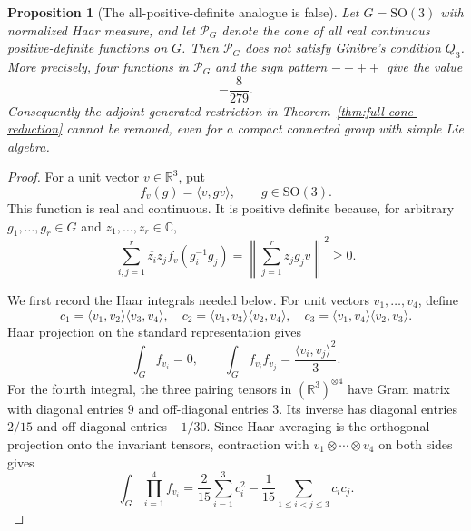 \documentclass[11pt,reqno]{amsart}
\theoremstyle{plain}
\newtheorem{proposition}[theorem]{Proposition}
\theoremstyle{definition}
\begin{document}
\begin{proposition}[The all-positive-definite analogue is false]
\label{prop:all-pd-counterexample}
Let $G=\mathrm{SO}(3)$ with normalized Haar measure, and let
$\mathcal P_G$ denote the cone of all real continuous positive-definite
functions on $G$.  Then $\mathcal P_G$ does not satisfy Ginibre's
condition $Q_3$.  More precisely, four functions in $\mathcal P_G$ and the
sign pattern $--++$ give the value
\[
 -\frac8{279}.
\]
Consequently the adjoint-generated restriction in
Theorem~\ref{thm:full-cone-reduction} cannot be removed, even for a compact
connected group with simple Lie algebra.
\end{proposition}

\begin{proof}
For a unit vector $v\in\mathbb R^3$, put
\[
 f_v(g)=\langle v,gv\rangle ,\qquad g\in\mathrm{SO}(3).
\]
This function is real and continuous.  It is positive definite because,
for arbitrary $g_1,\ldots,g_r\in G$ and $z_1,\ldots,z_r\in\mathbb C$,
\[
 \sum_{i,j=1}^r\overline{z_i}z_j f_v(g_i^{-1}g_j)
 =\left\lVert\sum_{j=1}^r z_jg_jv\right\rVert^2\geq0.
\]

We first record the Haar integrals needed below.  For unit vectors
$v_1,\ldots,v_4$, define
\[
 c_1=\langle v_1,v_2\rangle\langle v_3,v_4\rangle,
 \quad
 c_2=\langle v_1,v_3\rangle\langle v_2,v_4\rangle,
 \quad
 c_3=\langle v_1,v_4\rangle\langle v_2,v_3\rangle.
\]
Haar projection on the standard representation gives
\[
 \int_G f_{v_i}=0,
 \qquad
 \int_G f_{v_i}f_{v_j}
 =\frac{\langle v_i,v_j\rangle^2}{3}.
\]
For the fourth integral, the three pairing tensors in
$(\mathbb R^3)^{\otimes4}$ have Gram matrix with diagonal entries $9$ and
off-diagonal entries $3$.  Its inverse has diagonal entries $2/15$ and
off-diagonal entries $-1/30$.  Since Haar averaging is the orthogonal
projection onto the invariant tensors, contraction with
$v_1\otimes\cdots\otimes v_4$ on both sides gives
\begin{equation}
\label{eq:so3-four-coefficient-integral}
 \int_G\prod_{i=1}^4f_{v_i}
 =\frac2{15}\sum_{i=1}^3c_i^2
  -\frac1{15}\sum_{1\leq i<j\leq3}c_ic_j.
\end{equation}


\end{proof}
\end{document}
